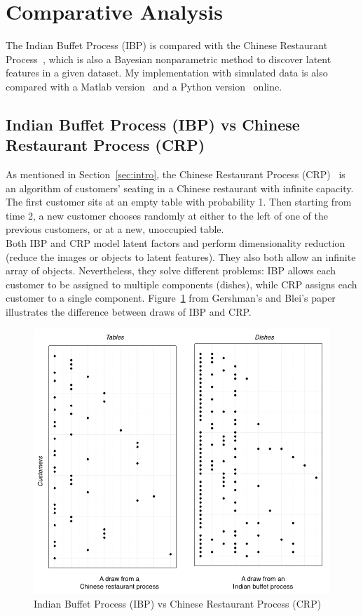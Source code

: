 \section{Comparative Analysis}

The Indian Buffet Process (IBP) is compared with the Chinese Restaurant Process~\cite{crp2004hierarchical}, which is also a Bayesian nonparametric method to discover latent features in a given dataset. My implementation with simulated data is also compared with a Matlab version~\cite{ibp2012code} and a Python version~\cite{ibpgithub} online.

\subsection{Indian Buffet Process (IBP) vs Chinese Restaurant Process (CRP)}

As mentioned in Section~\ref{sec:intro}, the Chinese Restaurant Process (CRP)~\cite{crp2004hierarchical} is an algorithm of customers' seating in a Chinese restaurant with infinite capacity. The first customer sits at an empty table with probability 1. Then starting from time 2, a new customer chooses randomly at either to the left of one of the previous customers, or at a new, unoccupied table.\\

Both IBP and CRP model latent factors and perform dimensionality reduction (reduce the images or objects to latent features). They also both allow an infinite array of objects. Nevertheless, they solve different problems: IBP allows each customer to be assigned to multiple components (dishes), while CRP assigns each customer to a single component. Figure~\ref{fig:CRP} from Gershman's and Blei's paper~\cite{gershman2012tutorial} illustrates the difference between draws of IBP and CRP.

\begin{figure}[!ht]
\centering
    \includegraphics[width=0.65\linewidth]{IBP_vs_CRP.png}
    \caption{Indian Buffet Process (IBP) vs Chinese Restaurant Process (CRP)~\cite{gershman2012tutorial}}
    \label{fig:CRP}
\end{figure}

